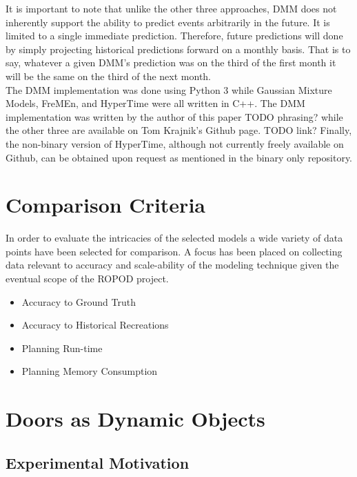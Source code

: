   It is important to note that unlike the other three approaches, DMM does
  not inherently support the ability to predict events arbitrarily in the future.
  It is limited to a single immediate prediction. Therefore, future predictions
  will done by simply projecting historical predictions forward on a monthly basis.
  That is to say, whatever a given DMM's prediction was on the third of the first month
  it will be the same on the third of the next month. \\

  The DMM implementation was done using Python 3 while Gaussian Mixture
  Models, FreMEn, and HyperTime were all written in C++. The DMM implementation
  was written by the author of this paper TODO phrasing? while the other three
  are available on Tom Krajnik's Github page. TODO link? Finally, the non-binary
  version of HyperTime, although not currently freely available on Github, can
  be obtained upon request as mentioned in the binary only repository.




  \section{ Comparison Criteria }
  In order to evaluate the intricacies of the selected models a wide variety
  of data points have been selected for comparison. A focus has been placed on
  collecting data relevant to accuracy and scale-ability of the modeling
  technique given the eventual scope of the ROPOD project.

  \begin{itemize}

    \item Accuracy to Ground Truth

    \item Accuracy to Historical Recreations

    \item Planning Run-time

    \item Planning Memory Consumption

  \end{itemize}

  \section{ Doors as Dynamic Objects }

  \subsection{ Experimental Motivation }

